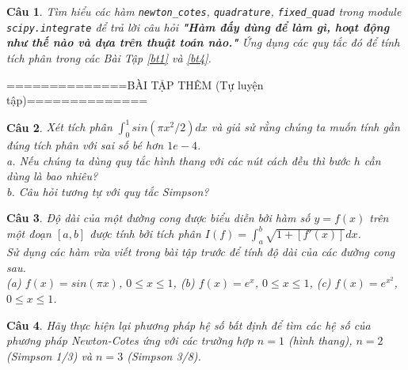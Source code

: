 \documentclass[11pt]{article}
\newtheorem{bt}{Câu}
\begin{document}
\begin{bt}
Tìm hiểu các hàm \verb|newton_cotes|, \verb|quadrature|, \verb|fixed_quad| trong module \verb|scipy.integrate| để trả lời câu hỏi \textbf{\emph{"Hàm đấy dùng để làm gì, hoạt động như thế nào và dựa trên thuật toán nào."}} Ứng dụng các quy tắc đó để tính tích phân trong các Bài Tập \ref{bt1} và \ref{bt4}. \\

%
\end{bt}

\begin{center}
	==============BÀI TẬP THÊM (Tự luyện tập)============== \\
\end{center}

\begin{bt}
Xét tích phân $\int_{0}^{1} sin(\pi x^2/2) dx$ và giả sử rằng chúng ta muốn tính gần đúng tích phân với sai số bé hơn $1e-4$. \\
a. Nếu chúng ta dùng quy tắc hình thang với các nút cách đều thì bước $h$ cần dùng là bao nhiêu?\\
b. Câu hỏi tương tự với quy tắc Simpson?	
\end{bt}

\begin{bt}\label{bt5}
	Độ dài của một đường cong được biểu diễn bởi hàm số $y=f(x)$ trên một đoạn $[a,b]$ được tính bởi tích phân $I(f) = \int_{a}^{b} \sqrt{1+[f'(x)]} dx$.\\ 
	Sử dụng các hàm vừa viết trong bài tập trước để tính độ dài của các đường cong sau. \\ 
	(a) $f(x)=sin(\pi x)$, $0\leq x \leq 1$, \qquad (b) $f(x)=e^x$, $0\leq x \leq 1$, \qquad (c) $f(x)=e^{x^2}$, $0\leq x \leq 1$.
\end{bt}

\begin{bt}
Hãy thực hiện lại phương pháp hệ số bất định để tìm các hệ số của phương pháp Newton-Cotes ứng với các trường hợp $n=1$ (hình thang), $n=2$ (Simpson 1/3) và $n=3$ (Simpson 3/8). 
\end{bt}
\end{document}
